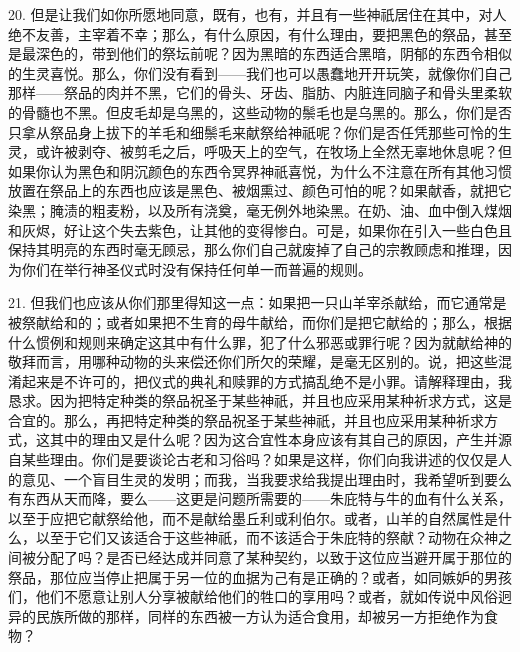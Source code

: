 20. 但是让我们如你所愿地同意，既有，也有，并且有一些神祇居住在其中，对人绝不友善，主宰着不幸；那么，有什么原因，有什么理由，要把黑色的祭品，甚至是最深色的，带到他们的祭坛前呢？因为黑暗的东西适合黑暗，阴郁的东西令相似的生灵喜悦。那么，你们没有看到——我们也可以愚蠢地开开玩笑，就像你们自己那样——祭品的肉并不黑，它们的骨头、牙齿、脂肪、内脏连同脑子和骨头里柔软的骨髓也不黑。但皮毛却是乌黑的，这些动物的鬃毛也是乌黑的。那么，你们是否只拿从祭品身上拔下的羊毛和细鬃毛来献祭给神祇呢？你们是否任凭那些可怜的生灵，或许被剥夺、被剪毛之后，呼吸天上的空气，在牧场上全然无辜地休息呢？但如果你认为黑色和阴沉颜色的东西令冥界神祇喜悦，为什么不注意在所有其他习惯放置在祭品上的东西也应该是黑色、被烟熏过、颜色可怕的呢？如果献香，就把它染黑；腌渍的粗麦粉，以及所有浇奠，毫无例外地染黑。在奶、油、血中倒入煤烟和灰烬，好让这个失去紫色，让其他的变得惨白。可是，如果你在引入一些白色且保持其明亮的东西时毫无顾忌，那么你们自己就废掉了自己的宗教顾虑和推理，因为你们在举行神圣仪式时没有保持任何单一而普遍的规则。\par

21. 但我们也应该从你们那里得知这一点：如果把一只山羊宰杀献给，而它通常是被祭献给和的；或者如果把不生育的母牛献给，而你们是把它献给的；那么，根据什么惯例和规则来确定这其中有什么罪，犯了什么邪恶或罪行呢？因为就献给神的敬拜而言，用哪种动物的头来偿还你们所欠的荣耀，是毫无区别的。说，把这些混淆起来是不许可的，把仪式的典礼和赎罪的方式搞乱绝不是小罪。请解释理由，我恳求。因为把特定种类的祭品祝圣于某些神祇，并且也应采用某种祈求方式，这是合宜的。那么，再把特定种类的祭品祝圣于某些神祇，并且也应采用某种祈求方式，这其中的理由又是什么呢？因为这合宜性本身应该有其自己的原因，产生并源自某些理由。你们是要谈论古老和习俗吗？如果是这样，你们向我讲述的仅仅是人的意见、一个盲目生灵的发明；而我，当我要求给我提出理由时，我希望听到要么有东西从天而降，要么——这更是问题所需要的——朱庇特与牛的血有什么关系，以至于应把它献祭给他，而不是献给墨丘利或利伯尔。或者，山羊的自然属性是什么，以至于它们又该适合于这些神祇，而不该适合于朱庇特的祭献？动物在众神之间被分配了吗？是否已经达成并同意了某种契约，以致于这位应当避开属于那位的祭品，那位应当停止把属于另一位的血据为己有是正确的？或者，如同嫉妒的男孩们，他们不愿意让别人分享被献给他们的牲口的享用吗？或者，就如传说中风俗迥异的民族所做的那样，同样的东西被一方认为适合食用，却被另一方拒绝作为食物？\par

